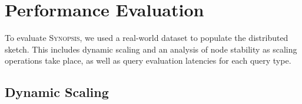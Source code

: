 \section{Performance Evaluation}
\label{sec:performance}
To evaluate \textsc{Synopsis}, we used a real-world dataset to populate the distributed sketch. This includes dynamic scaling and an analysis of node stability as scaling operations take place, as well as query evaluation latencies for each query type.

\subsection{Dynamic Scaling}




